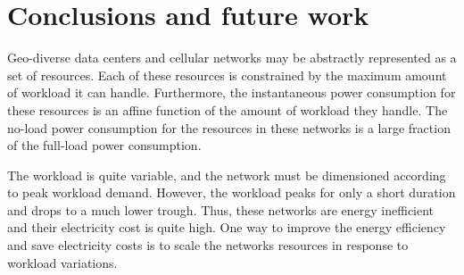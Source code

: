 \chapter{Conclusions and future work}
\label{chap:conclusions} Geo-diverse data centers and cellular networks may be abstractly represented as a set of resources. Each of these resources is constrained by the maximum amount of workload it can handle. Furthermore, the instantaneous power consumption for these resources is an affine function of the amount of workload they handle. The no-load power consumption for the resources in these networks is a large fraction of the full-load power consumption. 

The workload is quite variable, and the network must be dimensioned according to peak workload demand. However, the workload peaks for only a short duration and drops to a much lower trough. Thus, these networks are energy inefficient and their electricity cost is quite high. One way to improve the energy efficiency and save electricity costs is to scale the networks resources in response to workload variations.

